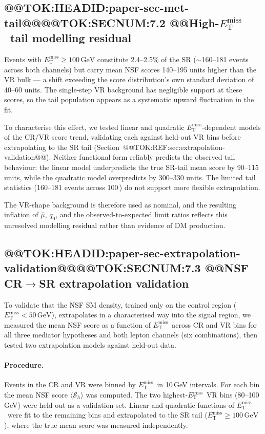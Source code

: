 \documentclass[11pt]{article}
\newcommand{\GeV}{\text{GeV}}
\newcommand{\MET}{\ensuremath{E_{\mathrm{T}}^{\mathrm{miss}}}}
\begin{document}
\subsection{@@TOK:HEADID:paper-sec-met-tail@@@@TOK:SECNUM:7.2 @@High-\MET\ tail modelling residual}

Events with $\MET\ge100\,\GeV$ constitute 2.4--2.5\% of the SR
($\sim$160--181 events across both channels) but carry mean NSF scores
140--195 units higher than the VR bulk --- a shift exceeding the score
distribution's own standard deviation of 40--60 units.
The single-step VR background has negligible support at these scores,
so the tail population appears as a systematic upward fluctuation in
the fit.

To characterise this effect, we tested linear and quadratic
\MET-dependent models of the CR/VR score trend, validating each against
held-out VR bins before extrapolating to the SR tail
(Section~@@TOK:REF:sec:extrapolation-validation@@).
Neither functional form reliably predicts the observed tail behaviour:
the linear model underpredicts the true SR-tail mean score by 90--115
units, while the quadratic model overpredicts by 300--330 units. The
limited tail statistics (160--181 events across 100\,\GeV) do not
support more flexible extrapolation.

The VR-shape background is therefore used as nominal, and the resulting
inflation of $\hat\mu$, $q_0$, and the observed-to-expected limit ratios
reflects this unresolved modelling residual rather than evidence of DM
production.

\subsection{@@TOK:HEADID:paper-sec-extrapolation-validation@@@@TOK:SECNUM:7.3 @@NSF CR$\to$SR extrapolation validation}

To validate that the NSF SM density, trained only on the control region
($\MET<50\,\GeV$), extrapolates in a characterised way into the signal
region, we measured the mean NSF score as a function of \MET\ across CR
and VR bins for all three mediator hypotheses and both lepton channels
(six combinations), then tested two extrapolation models against
held-out data.

\paragraph{Procedure.}
Events in the CR and VR were binned by \MET\ in 10\,GeV intervals.
For each bin the mean NSF score $\langle\mathcal{S}_h\rangle$ was
computed. The two highest-\MET\ VR bins (80--100\,GeV) were held out
as a validation set. Linear and quadratic functions of \MET\ were fit
to the remaining bins and extrapolated to the SR tail
($\MET\ge100\,\GeV$), where the true mean score was measured
independently.
\end{document}
